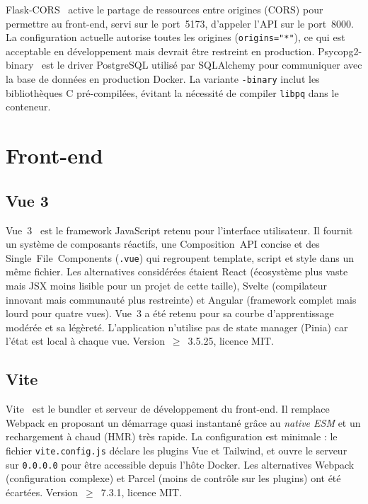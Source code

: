 \documentclass[12pt,a4paper,openany]{report}
\newcommand{\file}[1]{\texttt{#1}}
\begin{document}
Flask-CORS~\cite{flaskcors} active le partage de ressources entre origines (CORS) pour permettre au front-end, servi sur le port~5173, d'appeler l'API sur le port~8000. La configuration actuelle autorise toutes les origines (\texttt{origins="*"}), ce qui est acceptable en développement mais devrait être restreint en production. Psycopg2-binary~\cite{psycopg2} est le driver PostgreSQL utilisé par SQLAlchemy pour communiquer avec la base de données en production Docker. La variante \texttt{-binary} inclut les bibliothèques C pré-compilées, évitant la nécessité de compiler \texttt{libpq} dans le conteneur.

\section{Front-end}

\subsection{Vue 3}
Vue~3~\cite{vuejs} est le framework JavaScript retenu pour l'interface utilisateur. Il fournit un système de composants réactifs, une Composition~API concise et des Single~File~Components (\texttt{.vue}) qui regroupent template, script et style dans un même fichier. Les alternatives considérées étaient React (écosystème plus vaste mais JSX moins lisible pour un projet de cette taille), Svelte (compilateur innovant mais communauté plus restreinte) et Angular (framework complet mais lourd pour quatre vues). Vue~3 a été retenu pour sa courbe d'apprentissage modérée et sa légèreté. L'application n'utilise pas de state manager (Pinia) car l'état est local à chaque vue. Version~$\geq$~3.5.25, licence MIT.

\subsection{Vite}

Vite~\cite{vite} est le bundler et serveur de développement du front-end. Il remplace Webpack en proposant un démarrage quasi instantané grâce au \emph{native ESM} et un rechargement à chaud (HMR) très rapide. La configuration est minimale : le fichier \file{vite.config.js} déclare les plugins Vue et Tailwind, et ouvre le serveur sur \texttt{0.0.0.0} pour être accessible depuis l'hôte Docker. Les alternatives Webpack (configuration complexe) et Parcel (moins de contrôle sur les plugins) ont été écartées. Version~$\geq$~7.3.1, licence MIT.
\end{document}
